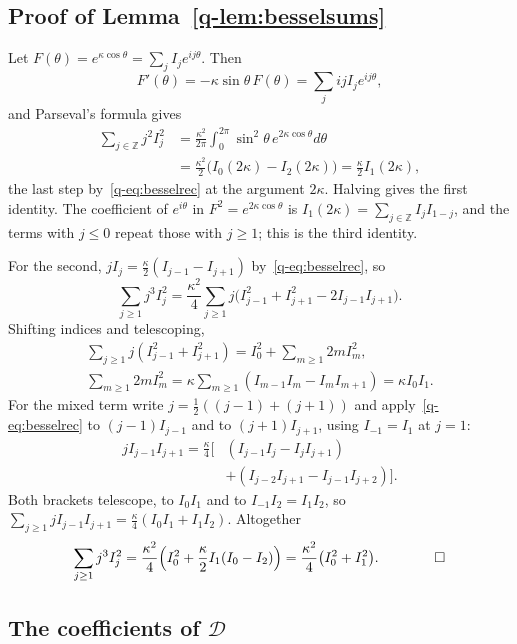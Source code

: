 \documentclass[11pt]{amsart}
\theoremstyle{definition}
\theoremstyle{remark}
\numberwithin{equation}{section}
\newcommand{\Z}{\mathbb{Z}}
\begin{document}
\subsection{Proof of Lemma~\ref{q-lem:besselsums}}

Let $F(\theta)=e^{\kappa\cos\theta}=\sum_jI_je^{ij\theta}$. Then
\[
F'(\theta)=-\kappa\sin\theta\,F(\theta)=\sum_jijI_je^{ij\theta},
\]
and Parseval's formula gives
\[
\begin{aligned}
\sum_{j\in\Z}j^2I_j^2&=\frac{\kappa^2}{2\pi}\int_0^{2\pi}\sin^2\theta\,
e^{2\kappa\cos\theta}d\theta\\
&=\frac{\kappa^2}2\bigl(I_0(2\kappa)-I_2(2\kappa)\bigr)=\frac\kappa2I_1(2\kappa),
\end{aligned}
\]
the last step by~\eqref{q-eq:besselrec} at the argument $2\kappa$. Halving gives
the first identity. The coefficient of $e^{i\theta}$ in $F^2=e^{2\kappa\cos
\theta}$ is $I_1(2\kappa)=\sum_{j\in\Z}I_jI_{1-j}$, and the terms with $j\le0$
repeat those with $j\ge1$; this is the third identity.

For the second, $jI_j=\frac\kappa2(I_{j-1}-I_{j+1})$ by~\eqref{q-eq:besselrec}, so
\[
\sum_{j\ge1}j^3I_j^2=\frac{\kappa^2}4\sum_{j\ge1}j\bigl(I_{j-1}^2+I_{j+1}^2-
2I_{j-1}I_{j+1}\bigr).
\]
Shifting indices and telescoping,
\[
\begin{gathered}
\textstyle\sum_{j\ge1}j(I_{j-1}^2+I_{j+1}^2)=I_0^2+\sum_{m\ge1}2mI_m^2,\\
\textstyle\sum_{m\ge1}2mI_m^2=\kappa\sum_{m\ge1}(I_{m-1}I_m-I_mI_{m+1})=\kappa I_0I_1 .
\end{gathered}
\]
For the mixed term write $j=\frac12((j-1)+(j+1))$
and apply~\eqref{q-eq:besselrec} to $(j-1)I_{j-1}$ and to $(j+1)I_{j+1}$,
using $I_{-1}=I_1$ at $j=1$:
\[
\begin{aligned}
jI_{j-1}I_{j+1}=\frac\kappa4\bigl[&(I_{j-1}I_j-I_jI_{j+1})\\
&+(I_{j-2}I_{j+1}-I_{j-1}I_{j+2})\bigr].
\end{aligned}
\]
Both brackets telescope, to $I_0I_1$ and to $I_{-1}I_2=I_1I_2$, so
$\sum_{j\ge1}jI_{j-1}I_{j+1}=\frac\kappa4(I_0I_1+I_1I_2)$. Altogether
\[
\sum_{j\ge1}j^3I_j^2=\frac{\kappa^2}4\Bigl(I_0^2+\frac\kappa2I_1(I_0-I_2)
\Bigr)=\frac{\kappa^2}4\bigl(I_0^2+I_1^2\bigr). \qquad\qed
\]

\subsection{\texorpdfstring{The coefficients of $\mathcal D$}{The coefficients of D}}
\end{document}
